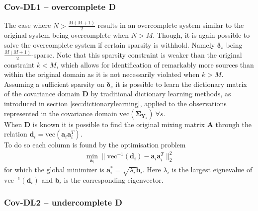 \subsubsection*{Cov-DL1 -- overcomplete \textbf{D}}
The case where $N > \frac{M(M+1)}{2}$ results in an overcomplete system similar to the original system being overcomplete when $N>M$. 
Though, it is again possible to solve the overcomplete system if certain sparsity is withhold. Namely $\boldsymbol{\delta}_s$ being  $\frac{M(M+1)}{2}$-sparse. Note that this sparsity constraint is  weaker than the original constraint $k<M$, which allows for identification of remarkably more sources than within the original domain as it is not necessarily violated when $k>M$.
Assuming a sufficient sparsity on $\boldsymbol{\delta}_s$ it is possible to learn the dictionary matrix of the covariance domain $\textbf{D}$ by traditional dictionary learning methods, as introduced in section \ref{sec:dictionarylearning}, applied to the observations represented in the covariance domain $\text{vec}(\boldsymbol{\Sigma}_{\mathbf{Y}_s})\ \forall s$.\\
When $\textbf{D}$ is known it is possible to find the original mixing matrix $\textbf{A}$ through the relation $\textbf{d}_i=\text{vec}(\textbf{a}_i\textbf{a}_i^T)$.\\
To do so each column is found by the optimisation problem 
\begin{align*}
\min_{\textbf{a}_i} \| \text{vec}^{-1}(\textbf{d}_i) -\textbf{a}_i\textbf{a}_i^T\|_2^2  
\end{align*}
for which the global minimizer is $\textbf{a}^{\ast}_i=\sqrt{\lambda_i}\textbf{b}_i$. Here $\lambda_i$ is the largest eignevalue of $\text{vec}^{-1}(\textbf{d}_i)$ and $\textbf{b}_i$ is the corresponding eigenvector.
  
  





\subsubsection*{Cov-DL2 -- undercomplete \textbf{D}}




